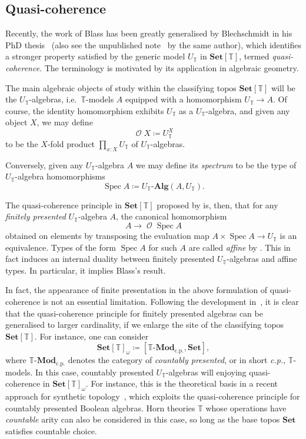 \documentclass[a4paper,12pt]{amsart}
\theoremstyle{definition}
\newcommand{\mc}[1]{\mathcal{#1}}
\newcommand{\mb}[1]{\mathbf{#1}}
\newcommand{\mbb}[1]{\mathbb{#1}}
\newcommand{\T}{\mbb T}
\newcommand{\mr}[1]{\mathrm{#1}}
\newcommand{\Set}{\mb{Set}}
\newcommand{\alg}{\text{-}\mb{Alg}}
\newcommand{\cp}{_{\mr{c.p.}}}
\newcommand{\mmod}[1]{#1\text{-}\mathbf{Mod}}
\newcommand{\spec}{\operatorname{Spec}}
\newcommand{\opens}{\operatorname{\mc{O}}} %
\begin{document}
\subsection{Quasi-coherence}\label{subsec:qc}

Recently, the work of Blass has been greatly generalised by Blechschmidt in his PhD thesis~\cite{blechschmidt2021using} (also see the unpublished note~\cite{blechschmidt2020general} by the same author), which identifies a stronger property satisfied by the generic model $U_\T$ in $\Set[\T]$, termed \emph{quasi-coherence}. The terminology is motivated by its application in algebraic geometry.

The main algebraic objects of study within the classifying topos $\Set[\T]$ will be the $U_\T$-algebras, i.e.\ $\T$-models $A$ equipped with a homomorphism $U_\T\to A$. Of course, the identity homomorphism exhibits $U_\T$ as a $U_\T$-algebra, and given any object $X$, we may define \[\opens X\coloneq U_\T^X\] to be the $X$-fold product $\prod_{x:X}U_\T$ of $U_\T$-algebras. 

Conversely, given any $U_\T$-algebra $A$ we may define its \emph{spectrum} to be the type of $U_\T$-algebra homomorphisms 
\[ \spec A \coloneq U_\T\alg(A,U_\T).\]

The quasi-coherence principle in $\Set[\T]$ proposed by \citet{blechschmidt2021using} is, then, that for any \emph{finitely presented} $U_\T$-algebra $A$, the canonical homomorphism
\[
  A\to \opens\spec A
\]
obtained on elements by transposing the evaluation map $A\times \spec A\to U_\T$ is an equivalence.
Types of the form $\spec A$ for such $A$ are called \emph{affine} by \citet{blechschmidt2021using}. This in fact induces an internal duality between finitely presented $U_\T$-algebras and affine types. In particular, it implies Blass's result. 

In fact, the appearance of finite presentation in the above formulation of quasi-coherence is not an essential limitation. Following the development in~\cite{blechschmidt2021using,blechschmidt2020general}, it is clear that the quasi-coherence principle for finitely presented algebras can be generalised to larger cardinality,
if we enlarge the site of the classifying topos $\Set[\T]$. For instance, one can consider
\[ \Set[\T]_\omega \coloneq [\mmod\T\cp,\Set], \]
where $\mmod\T\cp$ denotes the category of \emph{countably presented}, or in short \emph{c.p.}, $\T$-models. In this case, countably presented $U_\T$-algebras will enjoying quasi-coherence in $\Set[\T]_\omega$. For instance, this is the theoretical basis in a recent approach for synthetic topology~\cite{cherubini2024foundation}, which exploits the quasi-coherence principle for countably presented Boolean algebras. Horn theories $\T$ whose operations have \emph{countable} arity can also be considered in this case, so long as the base topos $\Set$ satisfies countable choice.
\end{document}
